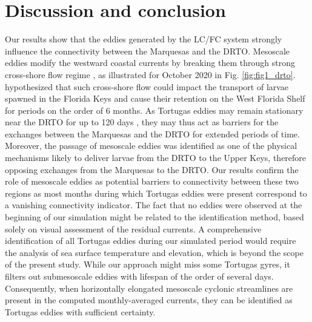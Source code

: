 \section{Discussion and conclusion}
Our results show that the eddies generated by the LC/FC system strongly influence the connectivity between the Marquesas and the DRTO. Mesoscale eddies modify the westward coastal currents by breaking them through strong cross-shore flow regime \citep{kourafalou2012florida}, as illustrated for October 2020 in Fig. \ref{fig:fig1_drto}. \cite{lee1994evolution} hypothesized that such cross-shore flow could impact the transport of larvae spawned in the Florida Keys and cause their retention on the West Florida Shelf for periods on the order of 6 months. As Tortugas eddies may remain stationary near the DRTO for up to 120 days \citep{fratantoni1998influence}, they may thus act as barriers for the exchanges between the Marquesas and the DRTO for extended periods of time. Moreover, the passage of mesoscale eddies was identified as one of the physical mechanisms likely to deliver larvae from the DRTO to the Upper Keys, therefore opposing exchanges from the Marquesas to the DRTO. Our results confirm the role of mesoscale eddies as potential barriers to connectivity between these two regions as most months during which Tortugas eddies were present correspond to a vanishing connectivity indicator. The fact that no eddies were observed at the beginning of our simulation might be related to the identification method, based solely on visual assessment of the residual currents. A comprehensive identification of all Tortugas eddies during our simulated period would require the analysis of sea surface temperature and elevation, which is beyond the scope of the present study. While our approach might miss some Tortugas gyres, it filters out submesoscale eddies with lifespan of the order of several days. Consequently, when horizontally elongated mesoscale cyclonic streamlines are present in the computed monthly-averaged currents, they can be identified as Tortugas eddies with sufficient certainty.

